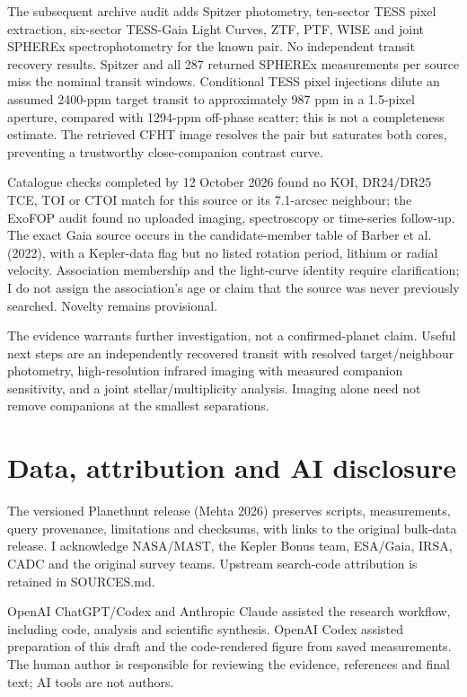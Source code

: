 \documentclass[twocolumn]{aastex7}
\begin{document}
The subsequent archive audit adds Spitzer photometry, ten-sector TESS pixel extraction, six-sector TESS-Gaia Light Curves, ZTF, PTF, WISE and joint SPHEREx spectrophotometry for the known pair. No independent transit recovery results. Spitzer and all 287 returned SPHEREx measurements per source miss the nominal transit windows. Conditional TESS pixel injections dilute an assumed 2400-ppm target transit to approximately 987 ppm in a 1.5-pixel aperture, compared with 1294-ppm off-phase scatter; this is not a completeness estimate. The retrieved CFHT image resolves the pair but saturates both cores, preventing a trustworthy close-companion contrast curve.

Catalogue checks completed by 12 October 2026 found no KOI, DR24/DR25 TCE, TOI or CTOI match for this source or its 7.1-arcsec neighbour; the ExoFOP audit found no uploaded imaging, spectroscopy or time-series follow-up. The exact Gaia source occurs in the candidate-member table of Barber et al. (2022), with a Kepler-data flag but no listed rotation period, lithium or radial velocity. Association membership and the light-curve identity require clarification; I do not assign the association's age or claim that the source was never previously searched. Novelty remains provisional.

The evidence warrants further investigation, not a confirmed-planet claim. Useful next steps are an independently recovered transit with resolved target/neighbour photometry, high-resolution infrared imaging with measured companion sensitivity, and a joint stellar/multiplicity analysis. Imaging alone need not remove companions at the smallest separations.

\section{Data, attribution and AI disclosure}
The versioned Planethunt release (Mehta 2026) preserves scripts, measurements, query provenance, limitations and checksums, with links to the original bulk-data release. I acknowledge NASA/MAST, the Kepler Bonus team, ESA/Gaia, IRSA, CADC and the original survey teams. Upstream search-code attribution is retained in SOURCES.md.

OpenAI ChatGPT/Codex and Anthropic Claude assisted the research workflow, including code, analysis and scientific synthesis. OpenAI Codex assisted preparation of this draft and the code-rendered figure from saved measurements. The human author is responsible for reviewing the evidence, references and final text; AI tools are not authors.
\end{document}
